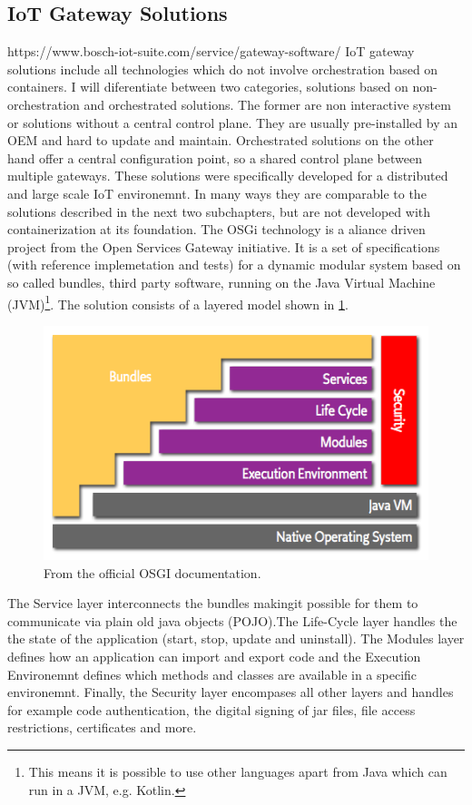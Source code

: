 \subsection{IoT Gateway Solutions}
https://www.bosch-iot-suite.com/service/gateway-software/
IoT gateway solutions include all technologies which do not involve orchestration based on containers. I will diferentiate between two categories, solutions based on non-orchestration and orchestrated solutions. The former are non interactive system or solutions without a central control plane. They are usually pre-installed by an OEM and hard to update and maintain. Orchestrated solutions on the other hand offer a central configuration point, so a shared control plane between multiple gateways. These solutions were specifically developed for a distributed and large scale IoT environemnt. In many ways they are comparable to the solutions described in the next two subchapters, but are not developed with containerization at its foundation. The OSGi technology\cite{osgiDefintion25:online} is a aliance driven project from the Open Services Gateway initiative. It is a set of specifications (with reference implemetation and tests) for a dynamic modular system based on so called bundles, third party software, running on the Java Virtual Machine (JVM)\footnote{This means it is possible to use other languages apart from Java which can run in a JVM, e.g. Kotlin.}. The solution consists of a layered model shown in \cref{fig:osgiLayerModel}. 
\begin{figure}[h!]
    \centering
    \includegraphics[scale=1.8]{figures/layering-osgi.png}
    \caption{From the official OSGI documentation\cite{osgiFrameworkArchitec22:online}.}
    \label{fig:osgiLayerModel}
\end{figure}
The Service layer interconnects the bundles makingit possible for them to communicate via plain old java objects (POJO).The Life-Cycle layer handles the the state of the application (start, stop, update and uninstall). The Modules layer defines how an application can import and export code and the Execution Environemnt defines which methods and classes are available in a specific environemnt. Finally, the Security layer encompases all other layers and handles for example code authentication, the digital signing of jar files, file access restrictions, certificates and more.\\
